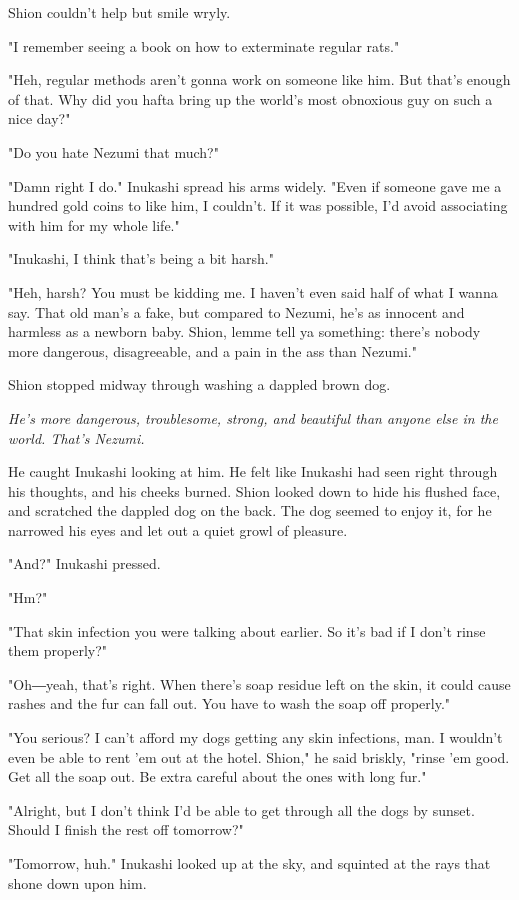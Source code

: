 Shion couldn't help but smile wryly.

"I remember seeing a book on how to exterminate regular rats."

"Heh, regular methods aren't gonna work on someone like him. But that's
enough of that. Why did you hafta bring up the world's most obnoxious
guy on such a nice day?"

"Do you hate Nezumi that much?"

"Damn right I do." Inukashi spread his arms widely. "Even if someone
gave me a hundred gold coins to like him, I couldn't. If it was
possible, I'd avoid associating with him for my whole life."

"Inukashi, I think that's being a bit harsh."

"Heh, harsh? You must be kidding me. I haven't even said half of what I
wanna say. That old man's a fake, but compared to Nezumi, he's as
innocent and harmless as a newborn baby. Shion, lemme tell ya something:
there's nobody more dangerous, disagreeable, and a pain in the ass than
Nezumi."

Shion stopped midway through washing a dappled brown dog.

\emph{He's more dangerous, troublesome, strong, and beautiful than anyone else
in the world. That's Nezumi.}

He caught Inukashi looking at him. He felt like Inukashi had seen right
through his thoughts, and his cheeks burned. Shion looked down to hide
his flushed face, and scratched the dappled dog on the back. The dog
seemed to enjoy it, for he narrowed his eyes and let out a quiet growl
of pleasure.

"And?" Inukashi pressed.

"Hm?"

"That skin infection you were talking about earlier. So it's bad if I
don't rinse them properly?"

"Oh―yeah, that's right. When there's soap residue left on the skin, it
could cause rashes and the fur can fall out. You have to wash the soap
off properly."

"You serious? I can't afford my dogs getting any skin infections, man. I
wouldn't even be able to rent 'em out at the hotel. Shion," he said
briskly, "rinse 'em good. Get all the soap out. Be extra careful about
the ones with long fur."

"Alright, but I don't think I'd be able to get through all the dogs by
sunset. Should I finish the rest off tomorrow?"

"Tomorrow, huh." Inukashi looked up at the sky, and squinted at the rays
that shone down upon him.

